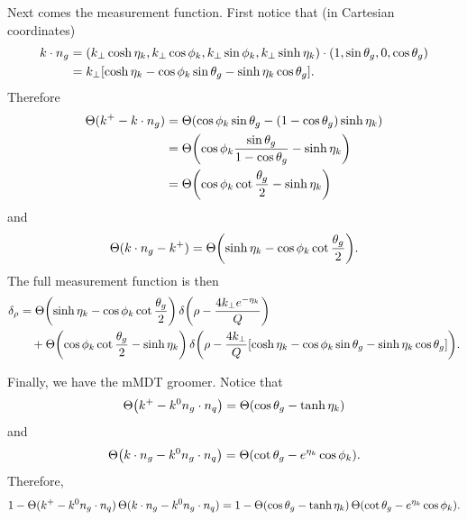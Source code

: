\documentclass[11pt,twoside,reqno]{amsart}
\theoremstyle{plain}
\theoremstyle{remark}
\theoremstyle{definition}
\theoremstyle{remark}
\theoremstyle{definition}
\theoremstyle{definition}
\begin{document}
	Next comes the measurement function. First notice that (in Cartesian coordinates)
	\begin{equation}
	\begin{aligned}
		k \cdot n_g &= (k_\perp \cosh\eta_k, k_\perp \cos\phi_k, k_\perp \sin\phi_k, k_\perp\sinh\eta_k) \cdot (1, \sin\theta_g, 0, \cos\theta_g) \\
		&= k_\perp \qty[\cosh\eta_k - \cos\phi_k \sin\theta_g - \sinh\eta_k \cos\theta_g].
	\end{aligned}
	\end{equation}
	Therefore
	\begin{equation}
	\begin{aligned}
		\Theta(k^+ - k\cdot n_g) &= \Theta\qty(\cos\phi_k \sin\theta_g - (1- \cos\theta_g)\sinh\eta_k) \\
		&= \Theta\qty(\cos\phi_k\frac{\sin\theta_g}{1 - \cos\theta_g} - \sinh\eta_k) \\
		&= \Theta\qty(\cos\phi_k\cot\frac{\theta_g}{2} - \sinh\eta_k)
	\end{aligned}
	\end{equation}
	and
	\begin{equation}
		\Theta(k\cdot n_g - k^+) = \Theta\qty(\sinh\eta_k - \cos\phi_k\cot\frac{\theta_g}{2}).
	\end{equation}
	The full measurement function is then
	\begin{equation}
	\begin{aligned}
		\delta_\rho &= \Theta\qty(\sinh\eta_k - \cos\phi_k\cot\frac{\theta_g}{2})\,\delta\qty(\rho - \frac{4 k_\perp e^{-\eta_k}}{Q}) \\
			&\quad+ \Theta\qty(\cos\phi_k\cot\frac{\theta_g}{2} - \sinh\eta_k)\, \delta\qty(\rho - \frac{4 k_\perp}{Q}\qty[\cosh\eta_k - \cos\phi_k\sin\theta_g - \sinh\eta_k\cos\theta_g]).
	\end{aligned}
	\end{equation}

	Finally, we have the mMDT groomer. Notice that
	\begin{equation}
		\Theta\qty(k^+ - k^0 n_g \cdot n_q) = \Theta(\cos\theta_g - \tanh\eta_k)
	\end{equation}
	and
	\begin{equation}
		\Theta\qty(k\cdot n_g - k^0 n_g \cdot n_q) = \Theta\qty(\cot\theta_g - e^{\eta_k}\cos\phi_k).
	\end{equation}
	Therefore,
	\begin{equation}
		1 - \Theta(k^+ - k^0 n_g \cdot n_q)\,\Theta(k \cdot n_g - k^0 n_g \cdot n_q) = 1 - \Theta(\cos\theta_g - \tanh\eta_k)\,\Theta\qty(\cot\theta_g - e^{\eta_k}\cos\phi_k).
	\end{equation}
\end{document}

